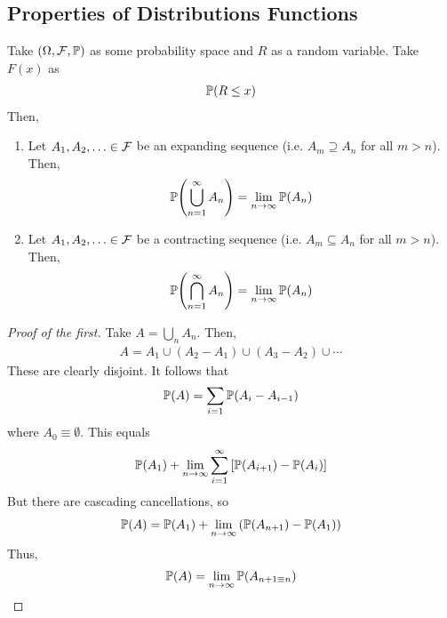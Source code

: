 \subsection{Properties of Distributions Functions}
Take $(\Omega, \mathcal{F}, \mathbb{P})$ as some probability space and $R$ as a random variable. Take $F(x)$ as
\begin{align}
    \mathbb{P}(R \le x)
\end{align}
Then,
\begin{proposition}
    \begin{enumerate}
        \item Let $A_1, A_2, \ldots \in \mathcal{F}$ be an expanding sequence (i.e. $A_m \supseteq A_n$ for all $m > n$). Then,
        \begin{align}
            \mathbb{P}\qty(\bigcup_{n=1}^\infty A_n) = \lim_{n\to\infty} \mathbb{P}(A_n)
        \end{align}
        \item Let $A_1, A_2, \ldots \in \mathcal{F}$ be a contracting sequence (i.e. $A_m \subseteq A_n$ for all $m > n$). Then,
        \begin{align}
            \mathbb{P}\qty(\bigcap_{n=1}^\infty A_n) = \lim_{n\to\infty} \mathbb{P}(A_n)
        \end{align}
    \end{enumerate}
\end{proposition}
\begin{proof}[Proof of the first]
    Take $A = \bigcup_{n} A_n$. Then,
    \begin{align}
        A = A_1 \cup (A_2 - A_1) \cup (A_3 - A_2) \cup \cdots
    \end{align}
    These are clearly disjoint. It follows that
    \begin{align}
        \mathbb{P}(A) = \sum_{i=1} \mathbb{P}(A_i - A_{i-1})
    \end{align}
    where $A_0 \equiv \emptyset$. This equals
    \begin{align}
        \mathbb{P}(A_1) + \lim_{n\to\infty} \sum_{i=1}^\infty \qty[\mathbb{P}(A_{i+1}) - \mathbb{P}(A_i)]
    \end{align}
    But there are cascading cancellations, so
    \begin{align}
        \mathbb{P}(A) = \mathbb{P}(A_1) + \lim_{n \to \infty} \left( \mathbb{P}(A_{n+1}) - \mathbb{P}(A_1) \right)
    \end{align}
    Thus,
    \begin{align}
        \mathbb{P}(A) = \lim_{n \to \infty} \mathbb{P} \qty(A_{n+1 \equiv n})
    \end{align}
\end{proof}

